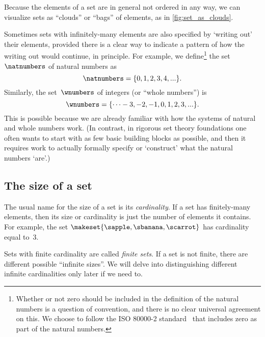 Because the elements of a set are in general not ordered in any way, we can visualize sets as ``clouds'' or ``bags'' of elements, as in \cref{fig:set_as_clouds}.

\begin{remark}
    Sometimes sets with infinitely-many elements are also specified by `writing out' their elements, provided there is a clear way to indicate a pattern of how the writing out would continue, in principle.
    For example, we define\footnote{Whether or not zero should be included in the definition of the natural numbers is a question of convention, and there is no clear universal agreement on this.
    We choose to follow the ISO 80000-2 standard~\cite{ISO:2009:IQU} that includes zero as part of the natural numbers.} the set $\natnumbers$ of natural numbers as 
    \begin{equation*}
        \natnumbers = \{0, 1, 2, 3, 4, .
        .. \}.
    \end{equation*}
    Similarly, the set~$\wnumbers$ of integers (or ``whole numbers'') is
    \begin{equation*}
        \wnumbers = \{\dots -3, -2, -1, 0, 1, 2, 3, ... \}.
    \end{equation*}
    This is possible because we are already familiar with how the systems of natural and whole numbers work.
    (In contrast, in rigorous set theory foundations one often wants to start with as few basic building blocks as possible, and then it requires work to actually formally specify or `construct' what the natural numbers `are'.)
\end{remark}

\subsection{The size of a set}

The usual name for the size of a set is its \emph{cardinality}.
If a set has finitely-many elements, then its size or cardinality is just the number of elements it contains.
For example, the  set
$
    \makeset{ \sapple, \sbanana, \scarrot }
$ has cardinality equal to~$3$.

Sets with finite cardinality are called \emph{finite sets}.
If a set is not finite, there are different possible ``infinite sizes''.
We will delve into distinguishing different infinite cardinalities only later if we need to.

